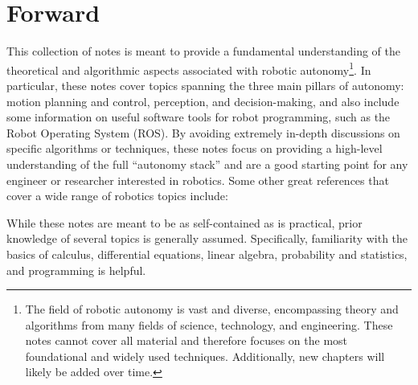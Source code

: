 \section*{Forward}
This collection of notes is meant to provide a fundamental understanding of the theoretical and algorithmic aspects associated with robotic autonomy\footnote{The field of robotic autonomy is vast and diverse, encompassing theory and algorithms from many fields of science, technology, and engineering. These notes cannot cover all material and therefore focuses on the most foundational and widely used techniques. Additionally, new chapters will likely be added over time.}. In particular, these notes cover topics spanning the three main pillars of autonomy: motion planning and control, perception, and decision-making, and also include some information on useful software tools for robot programming, such as the Robot Operating System (ROS). By avoiding extremely in-depth discussions on specific algorithms or techniques, these notes focus on providing a high-level understanding of the full ``autonomy stack'' and are a good starting point for any engineer or researcher interested in robotics. Some other great references that cover a wide range of robotics topics include:

\vspace{\baselineskip}


\vspace{\baselineskip}


\vspace{\baselineskip}

While these notes are meant to be as self-contained as is practical, prior knowledge of several topics is generally assumed. Specifically, familiarity with the basics of calculus, differential equations, linear algebra, probability and statistics, and programming is helpful.

